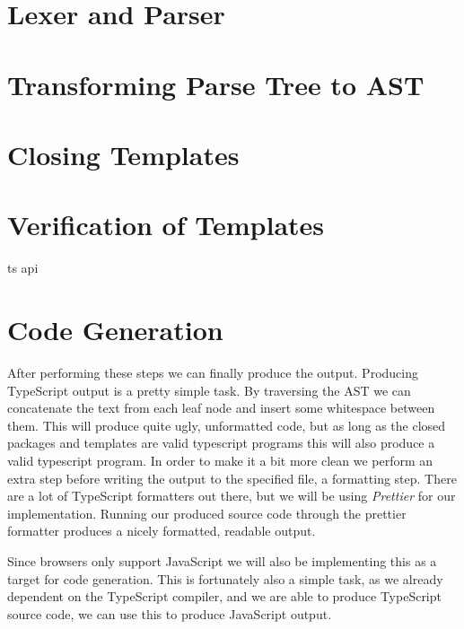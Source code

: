 \section{Lexer and Parser}\label{sec:lexer-and-parser}


\section{Transforming Parse Tree to AST}\label{sec:transforming-parse-tree-to-ast}


\section{Closing Templates}\label{sec:closing-templates}


\section{Verification of Templates}\label{sec:verification-of-templates}

ts api

\section{Code Generation}\label{sec:code-generation}

After performing these steps we can finally produce the output.
Producing TypeScript output is a pretty simple task.
By traversing the AST we can concatenate the text from each leaf node and insert some whitespace between them.
This will produce quite ugly, unformatted code, but as long as the closed packages and templates are valid typescript programs this will also produce a valid typescript program.
In order to make it a bit more clean we perform an extra step before writing the output to the specified file, a formatting step.
There are a lot of TypeScript formatters out there, but we will be using \textit{Prettier} for our implementation.
Running our produced source code through the prettier formatter produces a nicely formatted, readable output.

Since browsers only support JavaScript we will also be implementing this as a target for code generation.
This is fortunately also a simple task, as we already dependent on the TypeScript compiler, and we are able to produce TypeScript source code, we can use this to produce JavaScript output.

